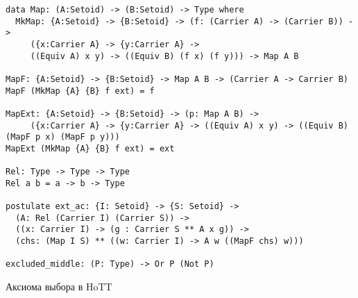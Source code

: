 \documentclass[aspectratio=169,dvipsnames,usenames]{beamer}
\begin{document}
\begin{frame}[fragile]{}
\footnotesize
\begin{verbatim}
data Map: (A:Setoid) -> (B:Setoid) -> Type where
  MkMap: {A:Setoid} -> {B:Setoid} -> (f: (Carrier A) -> (Carrier B)) -> 
     ({x:Carrier A} -> {y:Carrier A} -> 
     ((Equiv A) x y) -> ((Equiv B) (f x) (f y))) -> Map A B

MapF: {A:Setoid} -> {B:Setoid} -> Map A B -> (Carrier A -> Carrier B)
MapF (MkMap {A} {B} f ext) = f

MapExt: {A:Setoid} -> {B:Setoid} -> (p: Map A B) -> 
     ({x:Carrier A} -> {y:Carrier A} -> ((Equiv A) x y) -> ((Equiv B) (MapF p x) (MapF p y)))
MapExt (MkMap {A} {B} f ext) = ext

Rel: Type -> Type -> Type
Rel a b = a -> b -> Type

postulate ext_ac: {I: Setoid} -> {S: Setoid} -> 
  (A: Rel (Carrier I) (Carrier S)) -> 
  ((x: Carrier I) -> (g : Carrier S ** A x g)) ->
  (chs: (Map I S) ** ((w: Carrier I) -> A w ((MapF chs) w)))

excluded_middle: (P: Type) -> Or P (Not P)
\end{verbatim}
\end{frame}

\begin{frame}{Аксиома выбора в HoTT}
$$ $$
\end{frame}
\end{document}

